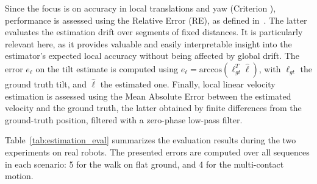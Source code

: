 \documentclass{IJCAS}
\newcommand{\critnum}[1]{\tikz[baseline=(char.base)]{
            \node[shape=circle,draw,inner sep=1pt](char){\textbf{#1}};}}
\begin{document}
Since the focus is on accuracy in local translations and yaw (Criterion \critnum{3}), performance is assessed using the Relative Error (RE), as defined in~\cite{Zhang2018QuantitativeTrajectoryEvaluation}. The latter evaluates the estimation drift over segments of fixed distances. It is particularly relevant here, as it provides valuable and easily interpretable insight into the estimator's expected local accuracy without being affected by global drift. The error $e_{\boldsymbol{\ell}}$ on the tilt estimate is computed using $e_{\boldsymbol{\ell}} = \text{arccos}\left(\boldsymbol{\ell}_{gt}^{T} \hat{\boldsymbol{\ell}} \right)$, with $\boldsymbol{\ell}_{gt}$ the ground truth tilt, and $\hat{\boldsymbol{\ell}}$ the estimated one. 
Finally, local linear velocity estimation is assessed using the Mean Absolute Error between the estimated velocity and the ground truth, the latter obtained by finite differences from the ground-truth position, filtered with a zero-phase low-pass filter.

Table~\ref{tab:estimation_eval} summarizes the evaluation results during the two experiments on real robots. The presented errors are computed over all sequences in each scenario: 5 for the walk on flat ground, and 4 for the multi-contact motion.


\end{document}

